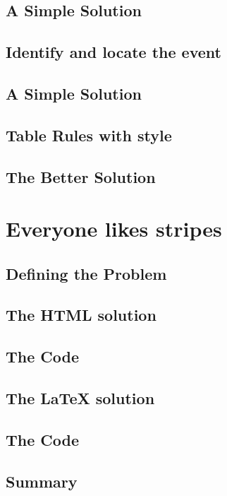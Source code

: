 \documentclass{book}
\begin{document}
\subsection{A Simple Solution}

\subsection{Identify and locate the event}

\subsection{A Simple Solution}

\subsection{Table Rules with style}

\subsection{The Better Solution}

\section{Everyone likes stripes}

\subsection{Defining the Problem}

\subsection{The HTML solution}

\subsection{The Code}

\subsection{The LaTeX solution}

\subsection{The Code}

\subsection{Summary}
\end{document}
